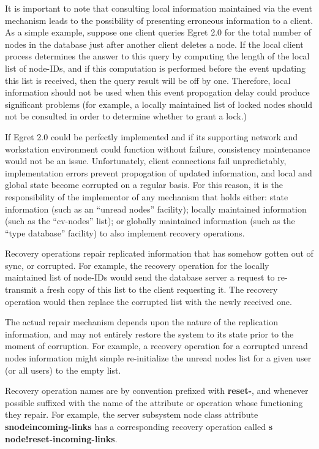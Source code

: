 It is important to note that consulting local information maintained
via the event mechanism leads to the possibility of presenting
erroneous information to a client.  As a simple example, suppose one
client queries Egret 2.0 for the total number of nodes in the database
just after another client deletes a node. If the local
client process determines the answer to this query by computing the length of the
local list of node-IDs, and if this computation is performed before the
event updating this list is received, then the query result will be
off by one.  Therefore, local information should not be used when this
event propogation delay could produce significant problems (for
example, a locally maintained list of locked nodes should not be
consulted in order to determine whether to grant a lock.)
 
If Egret 2.0 could be perfectly implemented and if its supporting
network and workstation environment could function without failure,
consistency maintenance would not be an issue.  Unfortunately, client
connections fail unpredictably, implementation errors prevent
propogation of updated information, and local and global state become
corrupted on a regular basis.  For this reason, it is the
responsibility of the implementor of any mechanism that holds either: state
information (such as an ``unread nodes'' facility); locally maintained
information (such as the ``cv-nodes'' list);  or globally maintained
information (such as the ``type database'' facility) to also implement
recovery operations.

Recovery operations repair replicated information that
has somehow gotten out of sync, or corrupted. For example, the 
recovery operation for the locally maintained list of node-IDs would
send the database server a request to re-transmit a fresh copy of this list
to the client requesting it.  The recovery operation would then replace
the corrupted list with the newly received one. 

The actual repair mechanism depends upon the nature of the replication
information, and may not entirely restore the system to its state
prior to the moment of corruption. For example, a recovery operation
for a corrupted unread nodes information might simple re-initialize
the unread nodes list for a given user (or all users) to the empty
list. 

Recovery operation names are by convention prefixed with {\bf reset-},
and whenever possible suffixed with the name of the attribute or
operation whose functioning they repair.  For example, the server
subsystem node class attribute {\bf s\STAR node\STAR incoming-links}
has a corresponding recovery operation called {\bf s\STAR
node!reset-incoming-links}.

